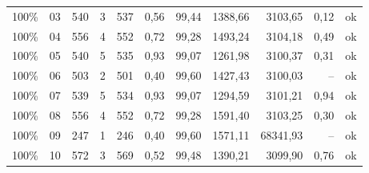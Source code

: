 \begin{longtable}{llrrrrrrrrl}
100\% & 03 & 540 & 3 & 537 & 0,56 & 99,44 & 1388,66 & 3103,65 & 0,12 & ok \\
100\% & 04 & 556 & 4 & 552 & 0,72 & 99,28 & 1493,24 & 3104,18 & 0,49 & ok \\
100\% & 05 & 540 & 5 & 535 & 0,93 & 99,07 & 1261,98 & 3100,37 & 0,31 & ok \\
100\% & 06 & 503 & 2 & 501 & 0,40 & 99,60 & 1427,43 & 3100,03 & -- & ok \\
100\% & 07 & 539 & 5 & 534 & 0,93 & 99,07 & 1294,59 & 3101,21 & 0,94 & ok \\
100\% & 08 & 556 & 4 & 552 & 0,72 & 99,28 & 1591,40 & 3103,25 & 0,30 & ok \\
100\% & 09 & 247 & 1 & 246 & 0,40 & 99,60 & 1571,11 & 68341,93 & -- & ok \\
100\% & 10 & 572 & 3 & 569 & 0,52 & 99,48 & 1390,21 & 3099,90 & 0,76 & ok \\
\bottomrule
\end{longtable}
